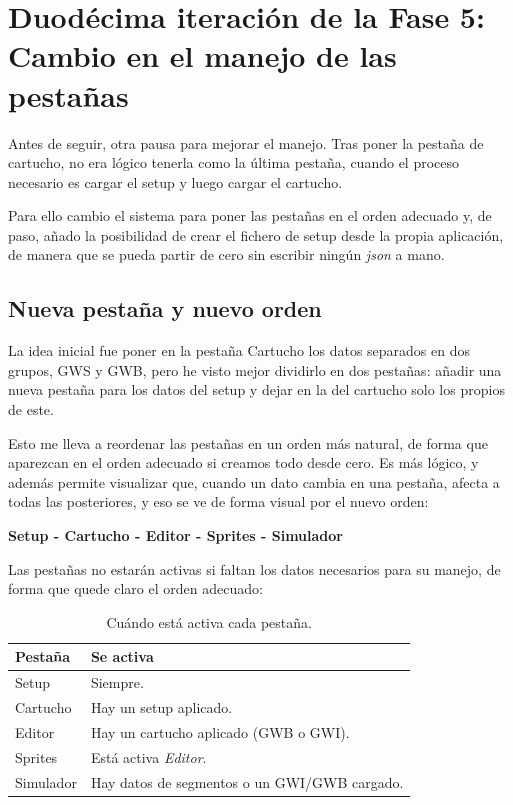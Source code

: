 \section{Duodécima iteración de la Fase 5: Cambio en el manejo de las pestañas}
\label{sec:F5I12}

Antes de seguir, otra pausa para mejorar el manejo. Tras poner la pestaña de cartucho, no era lógico tenerla como la última pestaña, cuando el proceso necesario es cargar el setup y luego cargar el cartucho.

Para ello cambio el sistema para poner las pestañas en el orden adecuado y, de paso, añado la posibilidad de crear el fichero de setup desde la propia aplicación, de manera que se pueda partir de cero sin escribir ningún \emph{json} a mano.

\subsection{Nueva pestaña y nuevo orden}
\label{sec:F5I12Orden}

La idea inicial fue poner en la pestaña Cartucho los datos separados en dos grupos, GWS y GWB, pero he visto mejor dividirlo en dos pestañas: añadir una nueva pestaña para los datos del setup y dejar en la del cartucho solo los propios de este.

Esto me lleva a reordenar las pestañas en un orden más natural, de forma que aparezcan en el orden adecuado si creamos todo desde cero. Es más lógico, y además permite visualizar que, cuando un dato cambia en una pestaña, afecta a todas las posteriores, y eso se ve de forma visual por el nuevo orden:\\

\centerline{\textbf{Setup - Cartucho - Editor - Sprites - Simulador}}

\vspace{0.5em}

Las pestañas no estarán activas si faltan los datos necesarios para su manejo, de forma que quede claro el orden adecuado:

\begin{table}[H]
	\centering
	\begin{tabular}{|l|p{9cm}|}
		\hline
		\textbf{Pestaña} & \textbf{Se activa} \\ \hline
		Setup & Siempre. \\ \hline
		Cartucho & Hay un setup aplicado. \\ \hline
		Editor & Hay un cartucho aplicado (GWB o GWI). \\ \hline
		Sprites & Está activa \emph{Editor}. \\ \hline
		Simulador & Hay datos de segmentos o un GWI/GWB cargado. \\ \hline
	\end{tabular}
	\caption{Cuándo está activa cada pestaña.}
\end{table}

